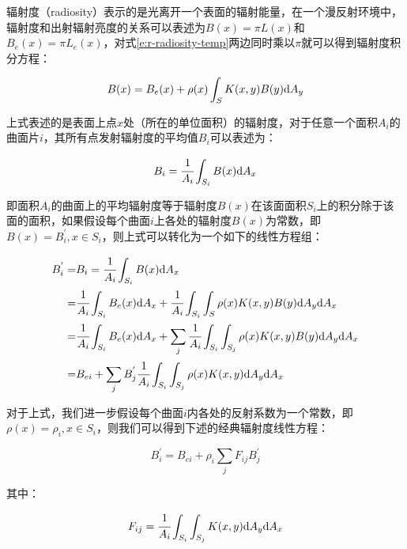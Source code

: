 辐射度（radiosity）表示的是光离开一个表面的辐射能量，在一个漫反射环境中，辐射度和出射辐射亮度的关系可以表述为$B(x)=\pi L(x)$和 $B_e(x)=\pi L_e(x)$，对式\ref{e:r-radiosity-temp}两边同时乘以$\pi$就可以得到辐射度积分方程：

\begin{equation}\label{e:radiosity-integral-equatoin}
	B(x)=B_e(x)+\rho(x)\int_S K(x,y)B(y){\rm d}A_y
\end{equation}

\noindent 上式表述的是表面上点$x$处（所在的单位面积）的辐射度，对于任意一个面积$A_i$的曲面片$i$，其所有点发射辐射度的平均值$B_i$可以表述为：

\begin{equation}\label{e:average-radiosity}
	B_i= \cfrac{1}{A_i}\int_{S_i}B(x){\rm d}A_x
\end{equation}

\noindent 即面积$A_i$的曲面上的平均辐射度等于辐射度$B(x)$在该面面积$S_i$上的积分除于该面的面积，如果假设每个曲面$i$上各处的辐射度$B(x)$为常数，即$B(x)=B^{'}_{i},x\in S_i$，则上式可以转化为一个如下的线性方程组：

\begin{equation}\label{e:r-assuming-constant-radiosity}
\begin{aligned}
	B_{i}^{'}=&B_i= \cfrac{1}{A_i}\int_{S_i}B(x){\rm d}A_x\\
			 =& \cfrac{1}{A_i}\int_{S_i}B_e(x){\rm d}A_x+ \cfrac{1}{A_i}\int_{S_i}\int_S \rho (x)K(x,y)B(y){\rm d}A_y{\rm d}A_x\\	
			 =& \cfrac{1}{A_i}\int_{S_i}B_e(x){\rm d}A_x+\sum_j  \cfrac{1}{A_i}\int_{S_i}\int_{S_j} \rho (x)K(x,y)B(y){\rm d}A_y{\rm d}A_x\\
			 =&B_{ei}+\sum_j B_{j}^{'} \cfrac{1}{A_i}\int_{S_i}\int_{S_j} \rho (x)K(x,y){\rm d}A_y{\rm d}A_x
\end{aligned}
\end{equation}

\noindent 对于上式，我们进一步假设每个曲面$i$内各处的反射系数为一个常数，即$\rho(x)=\rho_i,x\in S_i$，则我们可以得到下述的经典辐射度线性方程：

\begin{equation}\label{e:r-radiosity-system-of-equations}
	B_{i}^{'}=B_{ei}+\rho_i\sum_j F_{ij}B^{'}_{j}
\end{equation}

\noindent 其中：

\begin{equation}\label{e:r-form-factor}
	F_{ij}= \cfrac{1}{A_i}\int_{S_i}\int_{S_j}K(x,y){\rm d}A_y{\rm d}A_x
\end{equation}

